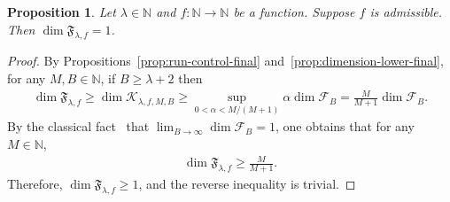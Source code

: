 \documentclass[12pt,reqno]{amsart}
\theoremstyle{definition}
\theoremstyle{plain}
\newtheorem{prop}{Proposition}
\begin{document}
\begin{prop}
\label{prop:eventual-full-dimension}
Let $\lambda\in\mathbb N$ and $f:\mathbb{N}\to\mathbb{N}$ be a function. Suppose $f$ is admissible. Then $\dim{\mathfrak{F}_{\lambda,f}}=1$.
\end{prop}
\begin{proof}
By Propositions~\ref{prop:run-control-final} and~\ref{prop:dimension-lower-final}, for any $M,B\in\mathbb{N}$, if $B\geq \lambda+2$ then
\begin{align*}
    \dim{\mathfrak{F}_{\lambda,f}}
    \geq \dim{\mathcal{K}_{\lambda,f,M,B}}
    \geq\sup_{0<\alpha<M/(M+1)}\alpha\dim{\mathcal{F}_B}
    =\frac{M}{M+1}\dim{\mathcal{F}_B}.
\end{align*}
By the classical fact~\cite{hensley1992continued,jarnik1928metrischen} that $\lim_{B\to\infty}\dim{\mathcal{F}_B}=1$, one obtains that for any $M\in\mathbb{N}$,
\begin{align*}
    \dim{\mathfrak{F}_{\lambda,f}}\geq\frac{M}{M+1}.
\end{align*}
Therefore, $\dim{\mathfrak{F}_{\lambda,f}}\geq1$, and the reverse inequality is trivial.
\end{proof}
\end{document}
